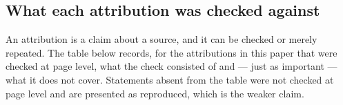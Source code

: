 
\subsection{What each attribution was checked against}\label{sec:provenance}

An attribution is a claim about a source, and it can be checked or merely repeated. The table below
records, for the attributions in this paper that were checked at page level, what the check consisted of
and --- just as important --- what it does not cover. Statements absent from the table were not checked at
page level and are presented as reproduced, which is the weaker claim.

